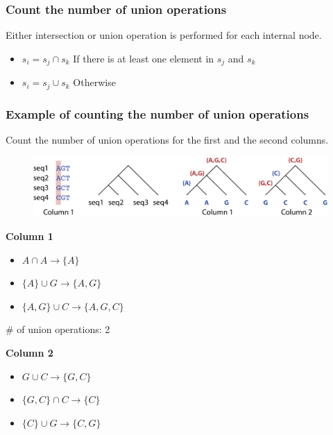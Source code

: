 %
%
\subsubsection*{Count the number of union operations}
Either intersection or union operation is performed for each internal node.

\begin{itemize}
\item $s_i=s_j \cap s_k$ \quad If there is at least one element in $s_j$ and $s_k$
\item $s_i=s_j \cup s_k$ \quad Otherwise
\end{itemize}

%
%
\subsubsection*{Example of counting the number of union operations}
Count the number of union operations for the first and the second columns.

\begin{figure}[H]
  \centering
      \includegraphics[width=0.8 \textwidth]{fig09/union_operations.png}
\end{figure}

\noindent
\textbf{Column 1}
\begin{itemize}
\item $A \cap A \rightarrow \{A\}$ 
\item $\{A\} \cup G \rightarrow \{A, G\}$ 
\item $\{A, G\} \cup C \rightarrow \{A, G, C\}$
\end{itemize}

\# of union operations: 2

\bigskip 

\noindent
\textbf{Column 2}
\begin{itemize}
\item $G \cup C \rightarrow \{G, C\}$ 
\item $\{G, C\} \cap C \rightarrow \{C\}$ 
\item $\{C\} \cup G \rightarrow \{C, G\}$
\end{itemize}

